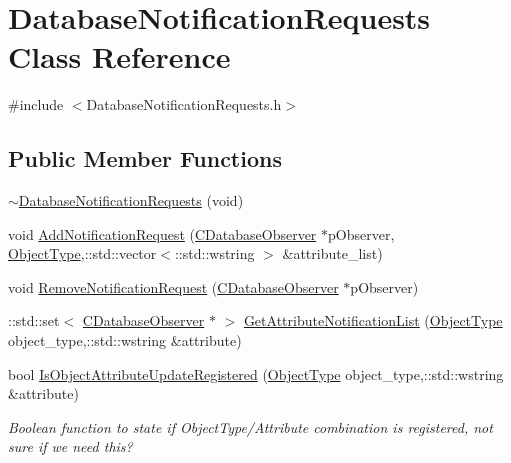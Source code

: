 \hypertarget{class_database_notification_requests}{}\section{Database\+Notification\+Requests Class Reference}
\label{class_database_notification_requests}


{\ttfamily \#include $<$Database\+Notification\+Requests.\+h$>$}

\subsection*{Public Member Functions}
\begin{DoxyCompactItemize}
\item 
\hyperlink{class_database_notification_requests_a67da93e660167fe18318305150cf519d}{$\sim$\+Database\+Notification\+Requests} (void)
\item 
void \hyperlink{class_database_notification_requests_a4e5d16a469e5666083e9f9c96b6dbe76}{Add\+Notification\+Request} (\hyperlink{class_c_database_observer}{C\+Database\+Observer} $\ast$p\+Observer, \hyperlink{_object_database_defines_8h_a842c5e2e69277690b064bf363c017980}{Object\+Type},\+::std\+::vector$<$\+::std\+::wstring $>$ \&attribute\+\_\+list)
\item 
void \hyperlink{class_database_notification_requests_a22af83967baaf88ae49942f87d023362}{Remove\+Notification\+Request} (\hyperlink{class_c_database_observer}{C\+Database\+Observer} $\ast$p\+Observer)
\item 
\+::std\+::set$<$ \hyperlink{class_c_database_observer}{C\+Database\+Observer} $\ast$ $>$ \hyperlink{class_database_notification_requests_a6c94c92562312678ec1df780ac8ec73b}{Get\+Attribute\+Notification\+List} (\hyperlink{_object_database_defines_8h_a842c5e2e69277690b064bf363c017980}{Object\+Type} object\+\_\+type,\+::std\+::wstring \&attribute)
\item 
bool \hyperlink{class_database_notification_requests_acced78482b6a5184e2af4ca2dd39a220}{Is\+Object\+Attribute\+Update\+Registered} (\hyperlink{_object_database_defines_8h_a842c5e2e69277690b064bf363c017980}{Object\+Type} object\+\_\+type,\+::std\+::wstring \&attribute)
\begin{DoxyCompactList}\small\item\em Boolean function to state if Object\+Type/\+Attribute combination is registered, not sure if we need this? \end{DoxyCompactList}\end{DoxyCompactItemize}

